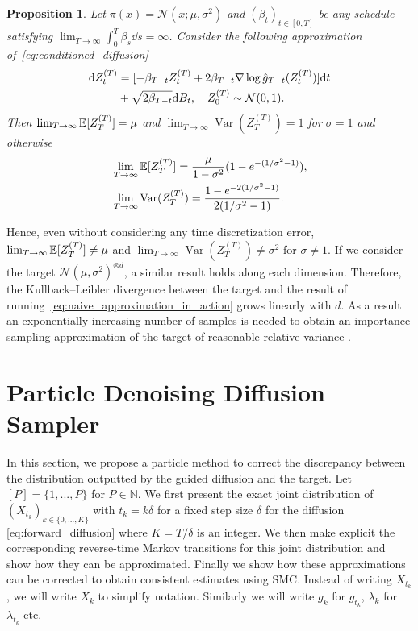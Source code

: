 \documentclass{article}
\theoremstyle{plain}
\newtheorem{proposition}[theorem]{Proposition}
\theoremstyle{definition}
\theoremstyle{remark}
\begin{document}
\newcommand{\revZ}{Z_t^{(T)}}
\begin{proposition}
	\label{lem:error_guidance}
	Let $\pi(x) = \mathcal N(x;\mu, \sigma^2)$ and $(\beta_t)_{t\in[0,T]}$ be any schedule satisfying $\lim_{T
			\rightarrow \infty} \int_0^T \beta_s \dd s = \infty$. Consider the following approximation of~\eqref{eq:conditioned_diffusion}
	\begin{align}
		\label{eq:naive_approximation_in_action}
		\dd \revZ & = [-\beta_{T-t} \revZ + 2\beta_{T-t} \gradlog \hat g_{T-t}(\revZ)] \dd t       \\
		          & + \sqrt{2\beta_{T-t}} \dd B_t,\quad  Z_0^{(T)} \sim \mathcal N(0, 1).\nonumber
	\end{align}
	Then $\lim_{T \to \infty} \mathbb{E}[Z_T^{(T)}]=\mu$ and  $\lim_{T \to \infty} \operatorname{Var}(Z_T^{(T)})=1$ for $\sigma=1$ and otherwise
	\begin{align}
		 & \lim_{T \to \infty} \mathbb{E}[Z_T^{(T)}]=\frac{\mu}{1-\sigma^2}(1 - e^{-(1/\sigma^2 - 1)}),                  \\
		 & \lim_{T \to \infty} \operatorname{Var}(Z_T^{(T)})=\frac{1 - e^{-2(1/\sigma^2-1)}}{2(1/\sigma^2 - 1)}.
	\end{align}

\end{proposition}
Hence, even without considering any time discretization error, $\lim_{T \to \infty} \mathbb{E}[Z_T^{(T)}] \neq \mu$ and $\lim_{T \to \infty} \operatorname{Var}(Z_T^{(T)}) \neq \sigma^2$ for $\sigma \neq 1$. If we consider the target $\mathcal N(\mu, \sigma^2)^{\otimes d}$, a similar result holds along each dimension. Therefore, the Kullback--Leibler divergence between the target and the result of running~\eqref{eq:naive_approximation_in_action} grows linearly with $d$. As a result an exponentially increasing number of samples is needed to obtain an importance sampling approximation of the target of reasonable relative variance \cite{chatterjee2018}.








\section{Particle Denoising Diffusion Sampler}\label{sec:Particle}
In this section, we propose a particle method to correct the discrepancy between the distribution outputted by the guided diffusion and the target. Let $[P]=\{1,...,P\}$ for $P\in\mathbb{N}$. We first present the exact joint distribution of $(X_{t_k})_{k\in \{0,...,K\}}$ with $t_k=k\delta$ for a fixed step size $\delta$ for the diffusion \eqref{eq:forward_diffusion} where $K=T/\delta$ is an integer. We then make explicit the corresponding reverse-time Markov transitions for this joint distribution and show how they can be approximated. Finally we show how these approximations can be corrected to obtain consistent estimates using SMC. Instead of writing $X_{t_k}$, we will write $X_k$ to simplify notation. Similarly we will write $g_k$ for $g_{t_k}$, $\lambda_k$ for $\lambda_{t_k}$ etc.
\end{document}
